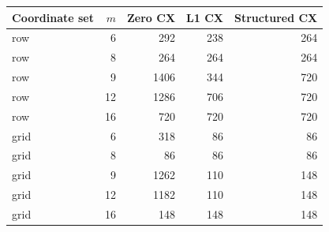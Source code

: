 \begin{tabular}{lrrrr}
\toprule
Coordinate set & $m$ & Zero CX & L1 CX & Structured CX\\
\midrule
row & 6 & 292 & 238 & 264\\
row & 8 & 264 & 264 & 264\\
row & 9 & 1406 & 344 & 720\\
row & 12 & 1286 & 706 & 720\\
row & 16 & 720 & 720 & 720\\
grid & 6 & 318 & 86 & 86\\
grid & 8 & 86 & 86 & 86\\
grid & 9 & 1262 & 110 & 148\\
grid & 12 & 1182 & 110 & 148\\
grid & 16 & 148 & 148 & 148\\
\bottomrule
\end{tabular}
